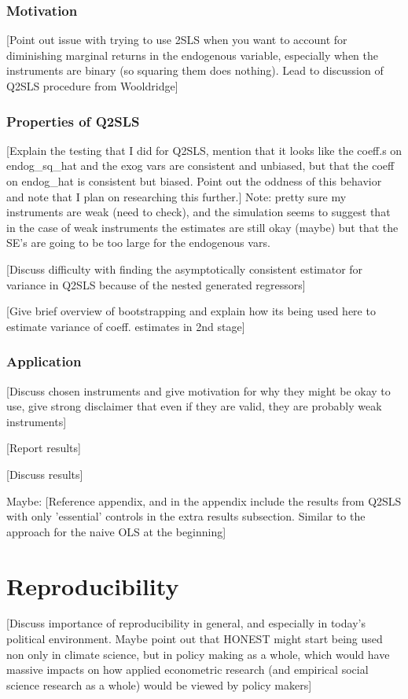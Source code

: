 \documentclass[12pt]{article}
\begin{document}
\subsubsection{Motivation}
\textcolor{BrickRed}{[Point out issue with trying to use 2SLS when you want to account for diminishing marginal returns in the endogenous variable, especially when the instruments are binary (so squaring them does nothing). Lead to discussion of Q2SLS procedure from Wooldridge]}

\subsubsection{Properties of Q2SLS}
\textcolor{BrickRed}{[Explain the testing that I did for Q2SLS, mention that it looks like the coeff.s on endog\_sq\_hat and the exog vars are consistent and unbiased, but that the coeff on endog\_hat is consistent but biased. Point out the oddness of this behavior and note that I plan on researching this further.]} Note: pretty sure my instruments are weak (need to check), and the simulation seems to suggest that in the case of weak instruments the estimates are still okay (maybe) but that the SE's are going to be too large for the endogenous vars.

\textcolor{BrickRed}{[Discuss difficulty with finding the asymptotically consistent estimator for variance in Q2SLS because of the nested generated regressors]}

\textcolor{BrickRed}{[Give brief overview of bootstrapping and explain how its being used here to estimate variance of coeff. estimates in 2nd stage]}

\subsubsection{Application}
\textcolor{BrickRed}{[Discuss chosen instruments and give motivation for why they might be okay to use, give strong disclaimer that even if they are valid, they are probably weak instruments]}

\textcolor{BrickRed}{[Report results]}

\textcolor{BrickRed}{[Discuss results]}

Maybe: \textcolor{BrickRed}{[Reference appendix, and in the appendix include the results from Q2SLS with only 'essential' controls in the extra results subsection. Similar to the approach for the naive OLS at the beginning]}


\newpage
\section{Reproducibility}
\textcolor{BrickRed}{[Discuss importance of reproducibility in general, and especially in today's political environment. Maybe point out that HONEST might start being used non only in climate science, but in policy making as a whole, which would have massive impacts on how applied econometric research (and empirical social science research as a whole) would be viewed by policy makers]}
\end{document}
